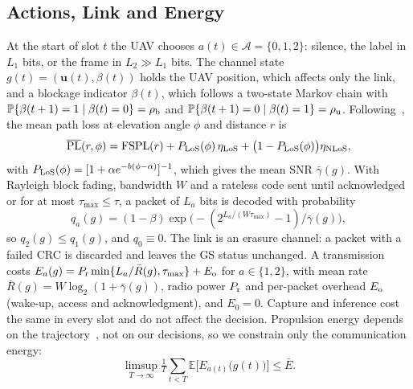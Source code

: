 \documentclass[conference]{IEEEtran}
\theoremstyle{remark}
\newcommand{\E}{\mathbb{E}}
\newcommand{\Prob}{\mathbb{P}}
\newcommand{\A}{\mathcal{A}}
\begin{document}
\subsection{Actions, Link and Energy}
At the start of slot $t$ the UAV chooses $a(t)\in\A=\{0,1,2\}$: silence, the label in $L_1$ bits, or the frame in $L_2\gg L_1$ bits. The channel state $g(t)=(\mathbf{u}(t),\beta(t))$ holds the UAV position, which affects only the link, and a blockage indicator $\beta(t)$, which follows a two-state Markov chain with $\Prob\{\beta(t+1)=1\mid\beta(t)=0\}=\rho_{\rm b}$ and $\Prob\{\beta(t+1)=0\mid\beta(t)=1\}=\rho_{\rm u}$. Following~\cite{alhourani2014lap}, the mean path loss at elevation angle $\phi$ and distance $r$ is
\begin{equation}\label{eq:pl}
\overline{\rm PL}(r,\phi)={\rm FSPL}(r)+P_{\rm LoS}(\phi)\,\eta_{\rm LoS}+\big(1-P_{\rm LoS}(\phi)\big)\eta_{\rm NLoS},
\end{equation}
with $P_{\rm LoS}(\phi)=[1+\alpha e^{-b(\phi-\alpha)}]^{-1}$, which gives the mean SNR $\bar\gamma(g)$. With Rayleigh block fading, bandwidth $W$ and a rateless code sent until acknowledged or for at most $\tau_{\max}\le\tau$, a packet of $L_a$ bits is decoded with probability
\begin{equation}\label{eq:succ}
q_a(g)=(1-\beta)\exp\big(-(2^{L_a/(W\tau_{\max})}-1)/\bar\gamma(g)\big),
\end{equation}
so $q_2(g)\le q_1(g)$, and $q_0\equiv0$. The link is an erasure channel: a packet with a failed CRC is discarded and leaves the GS status unchanged. A transmission costs $E_a(g)=P_{\rm r}\min\{L_a/\bar R(g),\tau_{\max}\}+E_{\rm o}$ for $a\in\{1,2\}$, with mean rate $\bar R(g)=W\log_2(1+\bar\gamma(g))$, radio power $P_{\rm r}$ and per-packet overhead $E_{\rm o}$ (wake-up, access and acknowledgment), and $E_0=0$. Capture and inference cost the same in every slot and do not affect the decision. Propulsion energy depends on the trajectory~\cite{zeng2019rotary}, not on our decisions, so we constrain only the communication energy:
\begin{equation}\label{eq:budget}
\limsup_{T\to\infty}\tfrac1T\textstyle\sum_{t<T}\E\Big[E_{a(t)}\big(g(t)\big)\Big]\le\bar E.
\end{equation}
\end{document}
